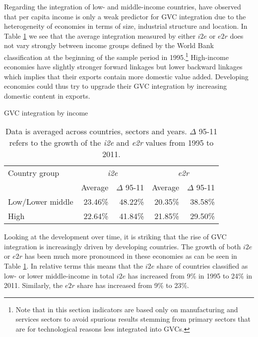 \documentclass[11pt,a4paper]{article}
\begin{document}
Regarding the integration of low- and middle-income countries, \citet{rojoguno12a} have observed that per capita income is only a weak predictor for GVC integration due to the heterogeneity of economies in terms of size, industrial structure and location. In Table \ref{tab:gvc} we see that the average integration measured by either $i2e$ or $e2r$ does not vary strongly between income groups defined by the World Bank classification at the beginning of the sample period in 1995.\footnote{Note that in this section indicators are based only on manufacturing and services sectors to avoid spurious results stemming from primary sectors that are for technological reasons less integrated into GVCs.}
High-income economies have slightly stronger forward linkages but lower backward linkages which implies that their exports contain more domestic value added. Developing economies could thus try to upgrade their GVC integration by increasing domestic content in exports.

\begin{table}[htbp]\small
  \centering
  \caption{GVC integration by income}
    \begin{tabular}{lrrrr}
    \toprule
    Country group & \multicolumn{2}{c}{\textit{i2e}} & \multicolumn{2}{c}{\textit{e2r}} \\
          & \multicolumn{1}{c}{Average} & \multicolumn{1}{c}{$\Delta$ 95-11} & \multicolumn{1}{c}{Average} & \multicolumn{1}{c}{$\Delta$ 95-11} \\
              \midrule
    Low/Lower middle & 23.46\% & 48.22\% & 20.35\% & 38.58\% \\
    High & 22.64\% & 41.84\% & 21.85\% & 29.50\% \\
    \bottomrule
    \end{tabular}
  \label{tab:gvc}
    \caption*{Data is averaged across countries, sectors and years. $\Delta$ 95-11 refers to the growth of the \textit{i2e} and \textit{e2r} values from 1995 to 2011.}
\end{table}

Looking at the development over time, it is striking that the rise of GVC integration is increasingly driven by developing countries. The growth of both $i2e$ or $e2r$ has been much more pronounced in these economies as can be seen in Table \ref{tab:gvc}. In relative terms this means that the $i2e$ share of countries classified as low- or lower middle-income in total $i2e$ has increased from 9\% in 1995 to 24\% in 2011. Similarly, the $e2r$ share has increased from 9\% to 23\%.
\end{document}
